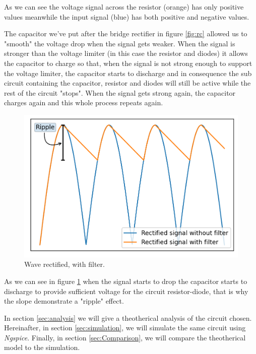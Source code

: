 As we can see the voltage signal across the resistor (orange) has only positive values
meanwhile the input signal (blue) has both positive and negative values.

The capacitor we've put after the bridge rectifier in figure \ref{fig:rc} allowed us to "smooth"
the voltage drop when the signal gets weaker. When the signal is stronger than the voltage limiter (in this case the resistor and diodes)
it allows the capacitor to charge so that, when the signal is not strong enough to support the voltage limiter, the capacitor
starts to discharge and in consequence the sub circuit containing the capacitor, resistor and diodes will still be
active while the rest of the circuit "stops". When the signal gets strong again, the capacitor charges again and this whole process repeats again.
\begin{figure}[h] \centering
    \includegraphics[scale=0.75]{filter.png}
    \caption{Wave rectified, with filter.}
    \label{fig:rc5}
\end{figure}

As we can see in figure \ref{fig:rc5} when the signal starts to drop the capacitor starts to discharge to provide
sufficient voltage for the circuit resistor-diode, that is why the slope demonstrate a "ripple" effect.

In section \ref{sec:analysis} we will give a theotherical analysis of the circuit chosen.
Hereinafter, in section \ref{sec:simulation}, we will simulate the same circuit using \emph{Ngspice}.
Finally, in section \ref{sec:Comparison}, we will compare the theotherical model to the simulation.


